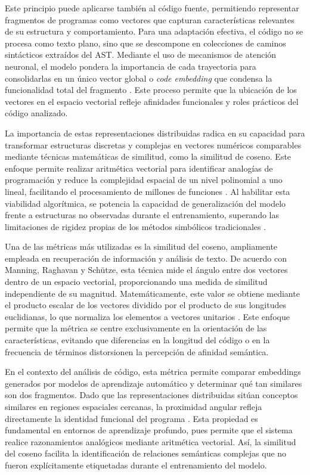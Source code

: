Este principio puede aplicarse también al código fuente, permitiendo representar fragmentos de programas como vectores que capturan características relevantes de su estructura y comportamiento. Para una adaptación efectiva, el código no se procesa como texto plano, sino que se descompone en colecciones de caminos sintácticos extraídos del AST. Mediante el uso de mecanismos de atención neuronal, el modelo pondera la importancia de cada trayectoria para consolidarlas en un único vector global o \textit{code embedding} que condensa la funcionalidad total del fragmento \cite{Alon2018Code2Vec}. Este proceso permite que la ubicación de los vectores en el espacio vectorial refleje afinidades funcionales y roles prácticos del código analizado.

La importancia de estas representaciones distribuidas radica en su capacidad para transformar estructuras discretas y complejas en vectores numéricos comparables mediante técnicas matemáticas de similitud, como la similitud de coseno. Este enfoque permite realizar aritmética vectorial para identificar analogías de programación y reduce la complejidad espacial de un nivel polinomial a uno lineal, facilitando el procesamiento de millones de funciones \cite{Alon2018Code2Vec}. Al habilitar esta viabilidad algorítmica, se potencia la capacidad de generalización del modelo frente a estructuras no observadas durante el entrenamiento, superando las limitaciones de rigidez propias de los métodos simbólicos tradicionales \cite{Mikolov2013Distributed, Alon2018Code2Vec}.

Una de las métricas más utilizadas es la similitud del coseno, ampliamente empleada en recuperación de información y análisis de texto. De acuerdo con Manning, Raghavan y Schütze, esta técnica mide el ángulo entre dos vectores dentro de un espacio vectorial, proporcionando una medida de similitud independiente de su magnitud. Matemáticamente, este valor se obtiene mediante el producto escalar de los vectores dividido por el producto de sus longitudes euclidianas, lo que normaliza los elementos a vectores unitarios \cite{Manning2008Introduction}. Este enfoque permite que la métrica se centre exclusivamente en la orientación de las características, evitando que diferencias en la longitud del código o en la frecuencia de términos distorsionen la percepción de afinidad semántica.

En el contexto del análisis de código, esta métrica permite comparar embeddings generados por modelos de aprendizaje automático y determinar qué tan similares son dos fragmentos. Dado que las representaciones distribuidas sitúan conceptos similares en regiones espaciales cercanas, la proximidad angular refleja directamente la identidad funcional del programa \cite{Alon2018Code2Vec}. Esta propiedad es fundamental en entornos de aprendizaje profundo, pues permite que el sistema realice razonamientos analógicos mediante aritmética vectorial. Así, la similitud del coseno facilita la identificación de relaciones semánticas complejas que no fueron explícitamente etiquetadas durante el entrenamiento del modelo.

